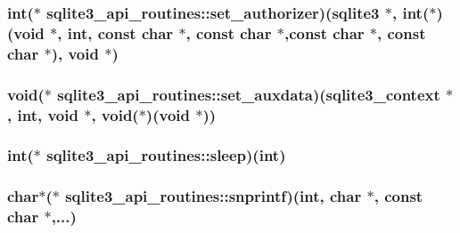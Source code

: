 \hypertarget{structsqlite3__api__routines_ac2da17f0959a69c053f6c5a711832994}{
\subsubsection[{set\-\_\-authorizer}]{\setlength{\rightskip}{0pt plus 5cm}int($\ast$ sqlite3\-\_\-api\-\_\-routines\-::set\-\_\-authorizer)({\bf sqlite3} $\ast$, int($\ast$)(void $\ast$, int, const char $\ast$, const char $\ast$,const char $\ast$, const char $\ast$), void $\ast$)}}\label{structsqlite3__api__routines_ac2da17f0959a69c053f6c5a711832994}
\hypertarget{structsqlite3__api__routines_a71c6f4befd8497adcf3bd78b720d4c6d}{
\subsubsection[{set\-\_\-auxdata}]{\setlength{\rightskip}{0pt plus 5cm}void($\ast$ sqlite3\-\_\-api\-\_\-routines\-::set\-\_\-auxdata)({\bf sqlite3\-\_\-context} $\ast$, int, void $\ast$, void($\ast$)(void $\ast$))}}\label{structsqlite3__api__routines_a71c6f4befd8497adcf3bd78b720d4c6d}
\hypertarget{structsqlite3__api__routines_ae7d2a4258889ab0de44cfce3a9f4b02b}{
\subsubsection[{sleep}]{\setlength{\rightskip}{0pt plus 5cm}int($\ast$ sqlite3\-\_\-api\-\_\-routines\-::sleep)(int)}}\label{structsqlite3__api__routines_ae7d2a4258889ab0de44cfce3a9f4b02b}
\hypertarget{structsqlite3__api__routines_a204fab9a7bbc4afa0ff208e0aca21afd}{
\subsubsection[{snprintf}]{\setlength{\rightskip}{0pt plus 5cm}char$\ast$($\ast$ sqlite3\-\_\-api\-\_\-routines\-::snprintf)(int, char $\ast$, const char $\ast$,...)}}\label{structsqlite3__api__routines_a204fab9a7bbc4afa0ff208e0aca21afd}
